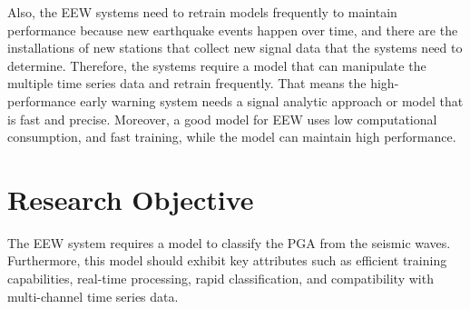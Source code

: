 Also, the EEW systems need to retrain models frequently to maintain performance because new earthquake events happen over time, and there are the installations of new stations that collect new signal data that the systems need to determine\cite{anikiev2022traveltime}. Therefore, the systems require a model that can manipulate the multiple time series data and retrain frequently\cite{anikiev2022traveltime, maharjan2022deep}. That means the high-performance early warning system needs a signal analytic approach or model that is fast and precise. Moreover, a good model for EEW uses low computational consumption, and fast training, while the model can maintain high performance\cite{anikiev2022traveltime}.





\section{Research Objective}
The EEW system requires a model to classify the PGA from the seismic waves. Furthermore, this model should exhibit key attributes such as efficient training capabilities, real-time processing, rapid classification, and compatibility with multi-channel time series data.

